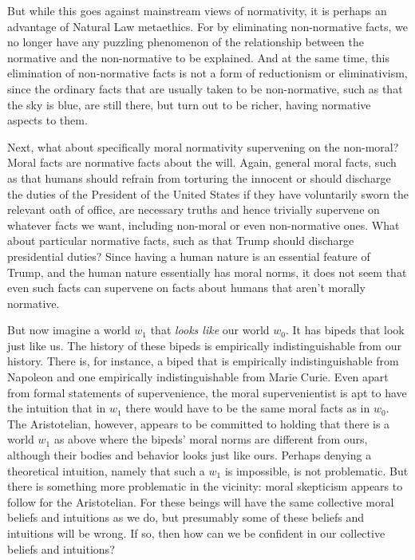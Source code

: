 But while this goes against mainstream views of normativity, it is perhaps an advantage of Natural Law metaethics. For by eliminating non-normative facts, we no longer have any puzzling phenomenon of the relationship 
between the normative and the non-normative to be explained. And at the same time, this elimination of
non-normative facts is not a form of reductionism or eliminativism, since the ordinary facts that are
usually taken to be non-normative, such as that the sky is blue, are still there, but turn out to be richer,
having normative aspects to them.

Next, what about specifically moral normativity supervening on the non-moral? Moral facts are normative facts about the
will. Again, general moral facts, such as that humans should refrain from torturing the innocent or should
discharge the duties of the President of the United States if they have voluntarily sworn the
relevant oath of office,
are necessary truths and hence trivially supervene on whatever facts we want, including
non-moral or even non-normative ones. What about particular normative facts, such as
that Trump should discharge presidential duties? Since having a human nature is an essential feature of
Trump, and the human nature essentially has moral norms, it does not seem that even such facts can supervene
on facts about humans that aren't morally normative.

But now imagine a world $w_1$ that \textit{looks like} our world $w_0$. It has bipeds that look  just like us. The history of these bipeds
is empirically indistinguishable from our history. 
There is, for instance, a biped that is empirically indistinguishable from Napoleon and
one empirically indistinguishable from Marie Curie. Even apart from formal statements of supervenience, the moral supervenientist is apt to have the intuition that in $w_1$ there would have to be the same moral facts as in $w_0$. 
The Aristotelian, however, appears to be committed to holding that there is a world $w_1$ as above where the
bipeds' moral norms are different from ours, although their bodies and behavior looks just like ours. 
Perhaps denying a theoretical intuition, namely that such a $w_1$ is impossible,
is not problematic. But there is something more problematic in the vicinity: 
moral skepticism appears to follow for the Aristotelian.
For these beings will have the same collective moral beliefs and intuitions as we do, but presumably some of these 
beliefs and intuitions will be wrong. If so, then how can we be confident in our collective beliefs and 
intuitions?


